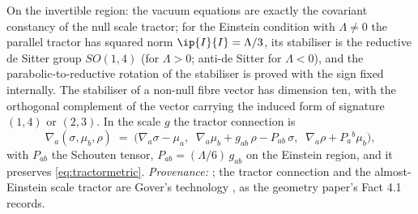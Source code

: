 On the invertible region: the vacuum equations are exactly the covariant constancy of the null scale tractor; for the Einstein condition with $\Lambda \neq 0$ the parallel tractor has squared norm $\ip{I}{I} = \Lambda/3$, its stabiliser is the reductive de Sitter group $SO(1,4)$ (for $\Lambda > 0$; anti-de Sitter for $\Lambda < 0$), and the parabolic-to-reductive rotation of the stabiliser is proved with the sign fixed internally. The stabiliser of a non-null fibre vector has dimension ten, with the orthogonal complement of the vector carrying the induced form of signature $(1,4)$ or $(2,3)$. In the scale $g$ the tractor connection is
\begin{equation}
\nabla_a(\sigma, \mu_b, \rho) \;=\; \bigl(\nabla_a\sigma - \mu_a,\;\; \nabla_a\mu_b + g_{ab}\,\rho - P_{ab}\,\sigma,\;\; \nabla_a\rho + P_a{}^{b}\mu_b\bigr),
\end{equation}
with $P_{ab}$ the Schouten tensor, $P_{ab} = (\Lambda/6)\,g_{ab}$ on the Einstein region, and it preserves \eqref{eq:tractormetric}. \emph{Provenance:} \cite[Fact~4.1, Thms.~4.5, 4.7, Props.~4.4, 4.10, Lem.~4.8]{ButlerT6}; the tractor connection and the almost-Einstein scale tractor are Gover's technology \cite{Gover2010}, as the geometry paper's Fact 4.1 records.
